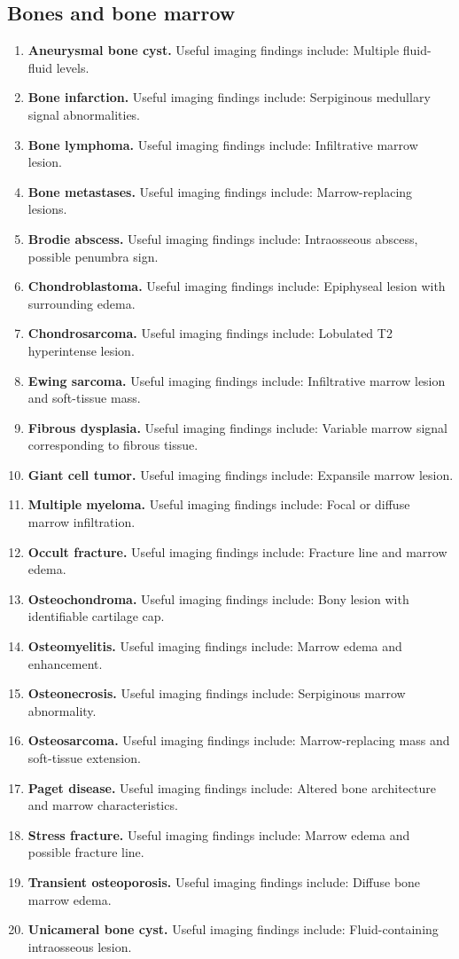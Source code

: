 \subsection{Bones and bone marrow}
\begin{enumerate}[leftmargin=*,itemsep=0.45em,topsep=0.4em]
\item \textbf{Aneurysmal bone cyst.} Useful imaging findings include: Multiple fluid-fluid levels.
\item \textbf{Bone infarction.} Useful imaging findings include: Serpiginous medullary signal abnormalities.
\item \textbf{Bone lymphoma.} Useful imaging findings include: Infiltrative marrow lesion.
\item \textbf{Bone metastases.} Useful imaging findings include: Marrow-replacing lesions.
\item \textbf{Brodie abscess.} Useful imaging findings include: Intraosseous abscess, possible penumbra sign.
\item \textbf{Chondroblastoma.} Useful imaging findings include: Epiphyseal lesion with surrounding edema.
\item \textbf{Chondrosarcoma.} Useful imaging findings include: Lobulated T2 hyperintense lesion.
\item \textbf{Ewing sarcoma.} Useful imaging findings include: Infiltrative marrow lesion and soft-tissue mass.
\item \textbf{Fibrous dysplasia.} Useful imaging findings include: Variable marrow signal corresponding to fibrous tissue.
\item \textbf{Giant cell tumor.} Useful imaging findings include: Expansile marrow lesion.
\item \textbf{Multiple myeloma.} Useful imaging findings include: Focal or diffuse marrow infiltration.
\item \textbf{Occult fracture.} Useful imaging findings include: Fracture line and marrow edema.
\item \textbf{Osteochondroma.} Useful imaging findings include: Bony lesion with identifiable cartilage cap.
\item \textbf{Osteomyelitis.} Useful imaging findings include: Marrow edema and enhancement.
\item \textbf{Osteonecrosis.} Useful imaging findings include: Serpiginous marrow abnormality.
\item \textbf{Osteosarcoma.} Useful imaging findings include: Marrow-replacing mass and soft-tissue extension.
\item \textbf{Paget disease.} Useful imaging findings include: Altered bone architecture and marrow characteristics.
\item \textbf{Stress fracture.} Useful imaging findings include: Marrow edema and possible fracture line.
\item \textbf{Transient osteoporosis.} Useful imaging findings include: Diffuse bone marrow edema.
\item \textbf{Unicameral bone cyst.} Useful imaging findings include: Fluid-containing intraosseous lesion.
\end{enumerate}

